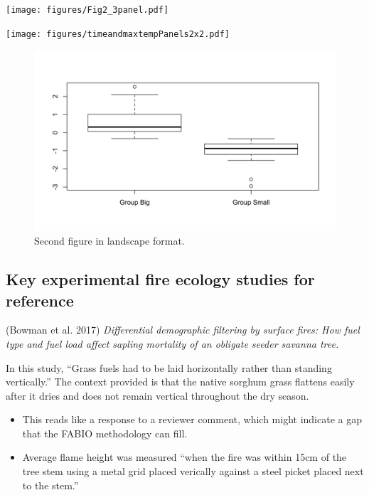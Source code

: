 \documentclass[11pt,a4paper]{article}
\newcommand{\blandscape}{\begin{landscape}}
\newcommand{\elandscape}{\end{landscape}}
\begin{document}
\newpage



\clearpage

\listoffigures


\newpage

\texttt{[image: figures/Fig2\_3panel.pdf]} \newpage

\newpage

\texttt{[image: figures/timeandmaxtempPanels2x2.pdf]}

\newpage

\blandscape

\begin{figure}
\centering
\includegraphics{figures/Fig2-1.png}
\caption{Second figure in landscape format.}
\end{figure}

\elandscape

\clearpage

\hypertarget{key-experimental-fire-ecology-studies-for-reference}{%
\subsection{Key experimental fire ecology studies for
reference}\label{key-experimental-fire-ecology-studies-for-reference}}

(Bowman et al. 2017) \emph{Differential demographic filtering by surface
fires: How fuel type and fuel load affect sapling mortality of an
obligate seeder savanna tree.}

In this study, ``Grass fuels had to be laid horizontally rather than
standing vertically.'' The context provided is that the native sorghum
grass flattens easily after it dries and does not remain vertical
throughout the dry season.

\begin{itemize}
\item
  This reads like a response to a reviewer comment, which might indicate
  a gap that the FABIO methodology can fill.
\item
  Average flame height was measured ``when the fire was within 15cm of
  the tree stem using a metal grid placed verically against a steel
  picket placed next to the stem.''
\end{itemize}
\end{document}
